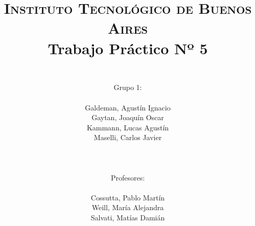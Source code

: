 



    \title{
        \normalfont \normalsize \textsc{Instituto Tecnol\'ogico de Buenos Aires} \\ [25pt]
        \huge Trabajo Pr\'actico Nº 5 \\
        \author{
            \\Grupo 1:\\\\Galdeman, Agust\'in Ignacio\\Gaytan, Joaqu\'in Oscar\\Kammann, Lucas Agust\'in\\Maselli, Carlos Javier\\ \\ \\ \\
            Profesores: \\\\ Cossutta, Pablo Mart\'in\\Weill, Mar\'ia Alejandra\\Salvati, Mat\'ias Dami\'an \\ \\ \\ 
        } 
    }

    \maketitle
    \newpage

    \tableofcontents

  
    \newpage
    
    
    
    
    
    
    
    

